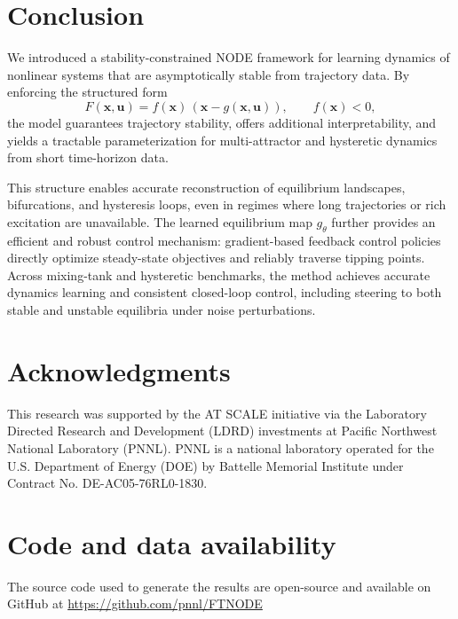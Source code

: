 \documentclass[11pt,twoside]{article}
\theoremstyle{plain}
\theoremstyle{definition}
\theoremstyle{remark}
\newcommand{\vect}[1]{\boldsymbol{#1}}
\begin{document}
\section{Conclusion}

We introduced a stability-constrained NODE framework for learning dynamics of nonlinear systems that are asymptotically stable from trajectory data. By enforcing the structured form
\[
F(\vect{x},\vect{u}) = f(\vect{x})\,(\vect{x} - g(\vect{x},\vect{u})), \qquad f(\vect{x}) < 0,
\]
the model guarantees trajectory stability, offers additional interpretability, and yields a tractable parameterization for multi-attractor and hysteretic dynamics from short time-horizon data.

This structure enables accurate reconstruction of equilibrium landscapes, bifurcations, and hysteresis loops, even in regimes where long trajectories or rich excitation are unavailable. The learned equilibrium map \(g_\theta\) further provides an efficient and robust control mechanism: gradient-based feedback control policies directly optimize steady-state objectives and reliably traverse tipping points. Across mixing-tank and hysteretic benchmarks, the method achieves accurate dynamics learning and consistent closed-loop control, including steering to both stable and unstable equilibria under noise perturbations.






\section*{Acknowledgments}
This research was supported by the AT SCALE initiative via the Laboratory Directed Research and Development (LDRD) investments at Pacific Northwest National Laboratory (PNNL). PNNL is a national laboratory operated for the U.S. Department of Energy (DOE) by Battelle Memorial Institute under Contract No. DE-AC05-76RL0-1830.

 

% 
% 




\appendix
\section{Code and data availability}
The source code used to generate the results are open-source and available on GitHub at \url{https://github.com/pnnl/FTNODE}
\end{document}
